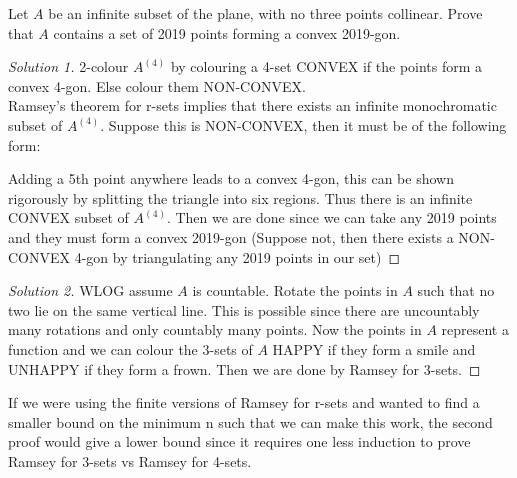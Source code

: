 \documentclass[a4paper]{article}
\begin{document}
	\begin{question}[Question 3]
	Let $A$ be an infinite subset of the plane, with no three points collinear. Prove that $A$ contains a set of 2019 points forming a convex 2019-gon.
	\end{question}
	\begin{proof}[Solution 1]
	2-colour $A^{(4)}$ by colouring a 4-set CONVEX if the points form a convex 4-gon. Else colour them NON-CONVEX.\\
	Ramsey's theorem for r-sets implies that there exists an infinite monochromatic subset of $A^{(4)}$. Suppose this is NON-CONVEX, then it must be of the following form:\\
	\begin{figure}[H]
	\centering
	\end{figure}
	Adding a 5th point anywhere leads to a convex 4-gon, this can be shown rigorously by splitting the triangle into six regions. Thus there is an infinite CONVEX subset of $A^{(4)}$. Then we are done since we can take any 2019 points and they must form a convex 2019-gon (Suppose not, then there exists a NON-CONVEX 4-gon by triangulating any 2019 points in our set)
	\end{proof}
	\begin{proof}[Solution 2]
	WLOG assume $A$ is countable. Rotate the points in $A$ such that no two lie on the same vertical line. This is possible since there are uncountably many rotations and only countably many points. Now the points in $A$ represent a function and we can colour the 3-sets of $A$ HAPPY if they form a smile and UNHAPPY if they form a frown. Then we are done by Ramsey for 3-sets.
	\end{proof}
	
	\begin{remark}
	If we were using the finite versions of Ramsey for r-sets and wanted to find a smaller bound on the minimum n such that we can make this work, the second proof would give a lower bound since it requires one less induction to prove Ramsey for 3-sets vs Ramsey for 4-sets.
	\end{remark}
	
\end{document}
